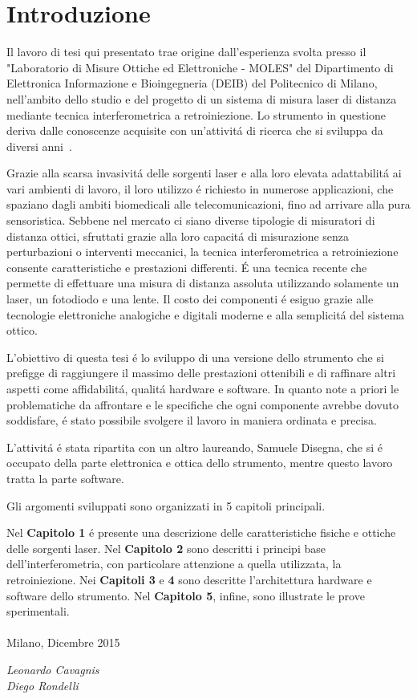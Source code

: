 \chapter*{Introduzione}
\label{Introduzione}
\thispagestyle{empty}

Il lavoro di tesi qui presentato trae origine dall'esperienza svolta presso il "Laboratorio di Misure Ottiche ed Elettroniche - MOLES" del Dipartimento di Elettronica Informazione e Bioingegneria (DEIB) del Politecnico di Milano, nell'ambito dello studio e del progetto di un sistema di misura laser di distanza mediante tecnica interferometrica a retroiniezione. Lo strumento in questione deriva dalle conoscenze acquisite con un'attivit\'a di ricerca che si sviluppa da diversi anni~\cite{341714}.

Grazie alla scarsa invasivit\'a delle sorgenti laser e alla loro elevata adattabilit\'a ai vari ambienti di lavoro, il loro utilizzo \'e richiesto in numerose applicazioni, che spaziano dagli ambiti biomedicali alle telecomunicazioni, fino ad arrivare alla pura sensoristica. Sebbene nel mercato ci siano diverse tipologie di misuratori di distanza ottici, sfruttati grazie alla loro capacit\'a di misurazione senza perturbazioni o interventi meccanici, la tecnica interferometrica a retroiniezione consente caratteristiche e prestazioni differenti. \'E una tecnica recente che permette di effettuare una misura di distanza assoluta utilizzando solamente un laser, un fotodiodo e una lente. Il costo dei componenti \'e esiguo grazie alle tecnologie elettroniche analogiche e digitali moderne e alla semplicit\'a del sistema ottico.

L'obiettivo di questa tesi \'e lo sviluppo di una versione dello strumento che si prefigge di raggiungere il massimo delle prestazioni ottenibili e di raffinare altri aspetti come affidabilit\'a, qualit\'a hardware e software. In quanto note a priori le problematiche da affrontare e le specifiche che ogni componente avrebbe dovuto soddisfare, \'e stato possibile svolgere il lavoro in maniera ordinata e precisa.

L'attivit\'a \'e stata ripartita con un altro laureando, Samuele Disegna, che si \'e occupato della parte elettronica e ottica dello strumento, mentre questo lavoro tratta la parte software.

\noindent Gli argomenti sviluppati sono organizzati in 5 capitoli principali.

Nel \textbf{Capitolo 1} \'e presente una descrizione delle caratteristiche fisiche e ottiche delle sorgenti laser. Nel \textbf{Capitolo 2} sono descritti i principi base dell'interferometria, con particolare attenzione a quella utilizzata, la retroiniezione. Nei \textbf{Capitoli 3} e \textbf{4} sono descritte l'architettura hardware e software dello strumento. Nel \textbf{Capitolo 5}, infine, sono illustrate le prove sperimentali.
\\
\\
Milano, Dicembre 2015
\begin{flushright}
\textit{Leonardo Cavagnis}\\
\textit{Diego Rondelli}
\end{flushright}
